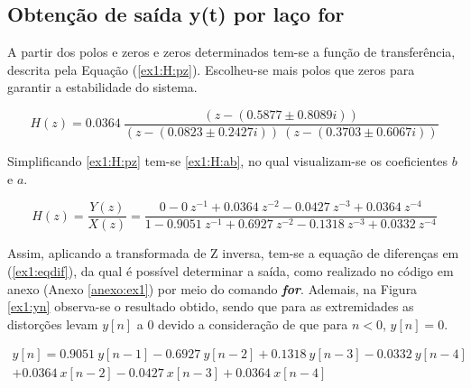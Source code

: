 \documentclass[a4paper,12pt,oneside,openany,table,xcdraw]{article}
\begin{document}
\subsection{Obtenção de saída y(t) por laço for}
A partir dos polos e zeros e zeros determinados tem-se a função de transferência, descrita pela Equação (\ref{ex1:H:pz}). Escolheu-se mais polos que zeros para garantir a estabilidade do sistema.

\begin{equation} \label{ex1:H:pz}
H(z) = 0.0364\  \dfrac{ (z - (0.5877 \pm 0.8089i) )}{(z - (0.0823 \pm 0.2427i))\ (z - (0.3703 \pm 0.6067i))}
\end{equation}
\vspace{0.1cm}

Simplificando \ref{ex1:H:pz} tem-se \ref{ex1:H:ab}, no qual visualizam-se os coeficientes $b$ e $a$.
\vspace{0.1cm}

\begin{equation} \label{ex1:H:ab}
H(z) = \dfrac{Y(z)}{X(z)}=\dfrac{0 - 0\ z^{-1} + 0.0364\ z^{-2} -0.0427\ z^{-3} + 0.0364\ z^{-4}}{1 -0.9051\ z^{-1} +0.6927\ z^{-2} -0.1318\ z^{-3} +0.0332\ z^{-4}}
\end{equation}
\vspace{0.2cm}

Assim, aplicando a transformada de Z inversa, tem-se a equação de diferenças em (\ref{ex1:eqdif}), da qual é possível determinar a saída, como realizado no código em anexo (Anexo \ref{anexo:ex1}) por meio do comando \textbf{\emph{for}}. Ademais, na Figura \ref{ex1:yn} observa-se o resultado obtido, sendo que para as extremidades as distorções levam $y[n]$ a 0 devido a consideração de que para $n<0$, $y[n]=0$.

\begin{multline} \label{ex1:eqdif}
y[n] = 0.9051\ y[n-1] - 0.6927 \ y[n-2]  +0.1318\ y[n-3]  - 0.0332\ y[n-4] \\
+ 0.0364\ x[n-2]   -0.0427\ x[n-3]  +  0.0364\ x[n-4]
\end{multline}
\end{document}
